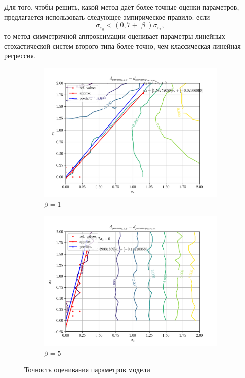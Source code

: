 Для того, чтобы решить, какой метод даёт более точные оценки параметров,
предлагается использовать следующее эмпирическое правило: если
\begin{equation*}
  \sigma_{\varepsilon_y} < (0{,}7 + |\beta|) \sigma_{\varepsilon_x},
\end{equation*}
то метод симметричной аппроксимации оценивает параметры линейных стохастической систем
второго типа более точно, чем классическая линейная регрессия.

\begin{figure}[p]
  \begin{subfigure}[b]{\linewidth}
    \centering
    \includegraphics[width=150mm]{fig/linear/param/beta-1_param-accs-diff-approx.png}
    \caption{\( \beta = 1 \)}
  \end{subfigure}

  \begin{subfigure}[b]{\linewidth}
    \centering
    \includegraphics[width=150mm]{fig/linear/param/beta-5_param-accs-diff-approx.png}
    \caption{\( \beta = 5\)}\label{fig:comparison_linear_params_beta-5}
  \end{subfigure}
  \caption{Точность оценивания параметров модели}\label{fig:comparison_linear_params}
\end{figure}

